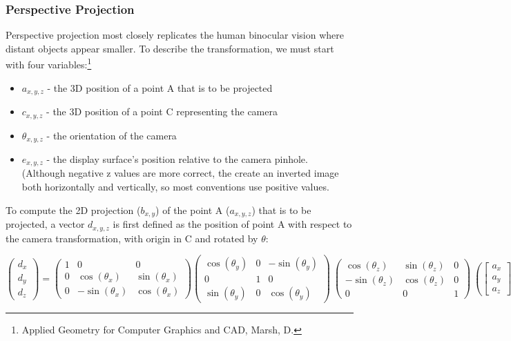 \documentclass{article}
\begin{document}
\subsubsection{Perspective Projection}
Perspective projection most closely replicates the human binocular vision where distant objects appear smaller. To describe the transformation, we must start with four variables:\footnote{Applied Geometry for Computer Graphics and CAD, Marsh, D.}

\begin{itemize}
  \item $a_{x, y, z}$ - the 3D position of a point A that is to be projected
  \item $c_{x, y, z}$ - the 3D position of a point C representing the camera
  \item $\theta_{x, y, z}$ - the orientation of the camera
  \item $e_{x, y, z}$ - the display surface's position relative to the camera pinhole. (Although negative z values are more correct, the create an inverted image both horizontally and vertically, so most conventions use positive values.
\end{itemize}

To compute the 2D projection ($b_{x, y}$) of the point A ($a_{x, y, z}$) that is to be projected, a vector $d_{x, y, z}$ is first defined as the position of point A with respect to the camera transformation, with origin in C and rotated by $\theta$:

\[\begin{pmatrix}
  d_{x} \\
  d_{y} \\
  d_{z} 
 \end{pmatrix}
=
\begin{pmatrix}
  1 & 0 & 0 \\
  0 & \cos(\theta_{x}) & \sin(\theta_{x}) \\
  0 &  -\sin(\theta_{x}) & \cos(\theta_{x}) 
 \end{pmatrix}
\begin{pmatrix}
  \cos(\theta_{y}) & 0 & -\sin(\theta_{y}) \\
  0 & 1 & 0 \\
  \sin(\theta_{y}) & 0  & \cos(\theta_{y}) 
 \end{pmatrix}\
\begin{pmatrix}
  \cos(\theta_{z}) & \sin(\theta_{z})  & 0  \\
  -\sin(\theta_{z}) & \cos(\theta_{z}) & 0 \\
  0 & 0  & 1 
 \end{pmatrix}\
\left(
\begin{bmatrix}
  a_{x} \\
  a_{y} \\
  a_{z} 
\end{bmatrix}\
-
\begin{bmatrix}
  c_{x} \\
  c_{y} \\
  c_{z} 
\end{bmatrix}\
\right)\]
\end{document}

